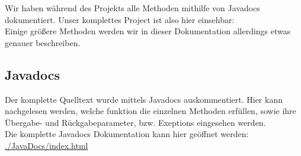 Wir haben während des Projekts alle Methoden mithilfe von Javadocs dokumentiert. Unser komplettes 
Project ist also hier einsehbar: %
\\

Einige größere Methoden werden wir in dieser Dokumentation allerdings etwas genauer beschreiben.

\subsection{Javadocs}
Der komplette Quelltext wurde mittels Javadocs auskommentiert. Hier kann nachgelesen werden, welche 
funktion die einzelnen Methoden erfüllen, sowie ihre Übergabe- und Rückgabeparameter, bzw. 
Exeptions  eingesehen werden.\\
Die komplette Javadocs Dokumentation kann hier geöffnet werden:\\
\url{./JavaDocs/index.html}